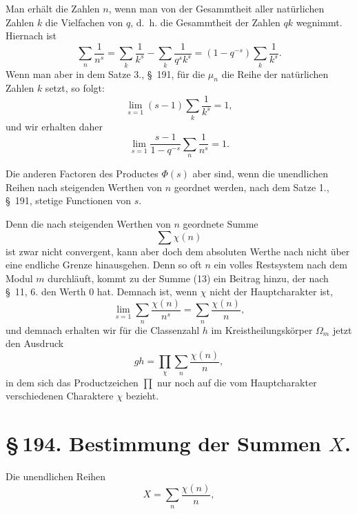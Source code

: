 \documentclass[11pt]{article}
\begin{document}
Man erhält die Zahlen $n$, wenn man von der Gesammtheit aller natürlichen Zahlen $k$ die Vielfachen von $q$, d.\ h. die Gesammtheit der Zahlen $qk$ wegnimmt. Hiernach ist
\[
\sum_n\frac1{n^s}=\sum_k\frac1{k^s}-\sum_k\frac1{q^s k^s}
=(1-q^{-s})\sum_k\frac1{k^s}.
\]
Wenn man aber in dem Satze 3., \S~191, für die $\mu_n$ die Reihe der natürlichen Zahlen $k$ setzt, so folgt:
\[
\lim_{s=1}(s-1)\sum_k\frac1{k^s}=1,
\]
und wir erhalten daher
\begin{equation}
\lim_{s=1}\frac{s-1}{1-q^{-s}}\sum_n\frac1{n^s}=1.
\tag{12}
\end{equation}

Die anderen Factoren des Productes $\Phi(s)$ aber sind, wenn die unendlichen Reihen nach steigenden Werthen von $n$ geordnet werden, nach dem Satze 1., \S~191, stetige Functionen von $s$.

Denn die nach steigenden Werthen von $n$ geordnete Summe
\begin{equation}
\sum\chi(n)
\tag{13}
\end{equation}
ist zwar nicht convergent, kann aber doch dem absoluten Werthe nach nicht über eine endliche Grenze hinausgehen. Denn so oft $n$ ein volles Restsystem nach dem Modul $m$ durchläuft, kommt zu der Summe (13) ein Beitrag hinzu, der nach \S~11, 6. den Werth $0$ hat. Demnach ist, wenn $\chi$ nicht der Hauptcharakter ist,
\begin{equation}
\lim_{s=1}\sum_n\frac{\chi(n)}{n^s}=\sum_n\frac{\chi(n)}{n},
\tag{14}
\end{equation}
und demnach erhalten wir für die Classenzahl $h$ im Kreistheilungskörper $\Omega_m$ jetzt den Ausdruck
\begin{equation}
gh=\prod_\chi\sum_n\frac{\chi(n)}{n},
\tag{15}
\end{equation}
in dem sich das Productzeichen $\prod$ nur noch auf die vom Hauptcharakter verschiedenen Charaktere $\chi$ bezieht.

\section*{\S\,194. Bestimmung der Summen $X$.}

Die unendlichen Reihen
\begin{equation}
X=\sum_n\frac{\chi(n)}{n},
\tag{1}
\end{equation}
\end{document}
